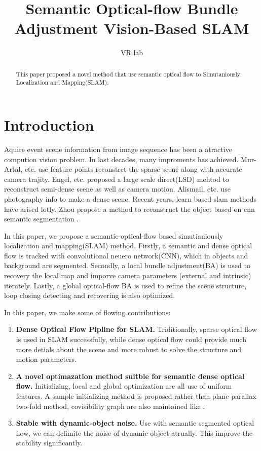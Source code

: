\documentclass{article}
\title{Semantic Optical-flow Bundle Adjustment Vision-Based SLAM}
\author{VR lab}
\affil{State Key Laboratory of Virtual Reality Technology and Systems, BUAA University}
\begin{document}
\maketitle

\begin{abstract}

This paper proposed a novel method that use semantic optical flow to Simutaniously Localization and Mapping(SLAM).

\end{abstract}

\section{Introduction}

Aquire event scene information from image sequence has been a atractive compution vision problem. In last decades, many improments has achieved. Mur-Artal, etc. \cite{Mur2017ORB} \cite{Mur2017ORB2} use feature points reconstrct the sparse scene along with accurate camera trajity. Engel, etc. \cite{Engel2014LSD} \cite{Engel2015Large} \cite{Caruso2015Large} proposed a large scale direct(LSD) mehtod to reconstruct semi-dense scene as well as camera motion. Alismail, etc. \cite{Alismail2016Photometric} use photography info to make a dense scene. Recent years, learn based slam methods have arised lotly. Zhou propose a method to reconstruct the object based-on cnn semantic segmentation \cite{Rui2018Semantic}.\par

In this paper, we propose a semantic-optical-flow based simutianiously localization and mapping(SLAM) method. Firstly, a semantic and dense optical flow is tracked with convolutional neuero network(CNN), which in objects and background are segmented. Secondly, a local bundle adjustment(BA) is used to recovery the local map and imporve camera parameters (external and intrinsic) iterately. Lastly, a global optical-flow BA is used to refine the scene structure, loop closing detecting and recovering is also optimized.

In this paper, we make some of flowing contributions:

\begin{enumerate}
\item \textbf{Dense Optical Flow Pipline for SLAM.} Triditionally, sparse optical flow is used in SLAM successfully, while dense optical flow could provide much more detials about the scene and more robust to solve the structure and motion parameters.

\item \textbf{A novel optimazation method suitble for semantic dense optical flow.} Initializing, local and global optimization are all use of uniform features. A sample initializing method is proposed rather than plane-parallax two-fold method, covisibility graph are also maintained like \cite{Mur2017ORB}.

\item \textbf{Stable with dynamic-object noise.} Use with semantic segmented optical flow, we can delimite the noise of dynamic object atrually. This improve the stability significantly.
\end{enumerate}
\end{document}
